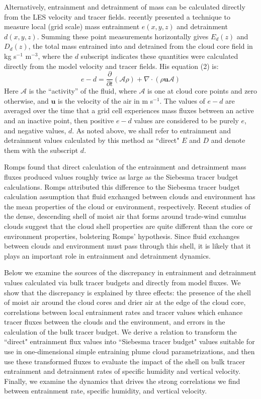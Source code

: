 \documentclass[12pt]{article}
\begin{document}
Alternatively, entrainment and detrainment of mass can be calculated directly
from the LES velocity and tracer fields.  \cite{Romps2010} recently presented a 
technique to measure local (grid scale) mass entrainment $e(x,y,z)$ and
detrainment $d(x,y,z)$.  Summing these point measurements horizontally gives 
$E_d(z)$ and $D_d(z)$, the total mass entrained into and detrained from the
cloud core field in kg s$^{-1}$ m$^{-3}$, where the $d$ subscript indicates 
these quantities were calculated directly from the model velocity and tracer
fields.  His equation (2) is:
\begin{equation}
  \label{eq:romps_e_minus_d}
  e - d = \frac{\partial}{\partial t}(\mathcal{A}\rho) 
        + \nabla \cdot (\rho \mathbf{u} \mathcal{A}) 
\end{equation}
Here $\mathcal{A}$ is the ``activity'' of the fluid, where
$\mathcal{A}$ is one at cloud core points and zero otherwise, and
$\mathbf{u}$ is the velocity of the air in m s$^{-1}$.  The values of
$e - d$ are averaged over the time that a grid cell experiences mass
fluxes between an active and an inactive point, then positive $e-d$
values are considered to be purely $e$, and negative values, $d$.  As
noted above, we shall refer to entrainment and detrainment values
calculated by this method as ``direct" $E$ and $D$ and denote them
with the subscript $d$.

Romps found that direct calculation of the entrainment and
detrainment mass fluxes produced values roughly twice as large as
the Siebesma tracer budget calculations.  Romps attributed this difference
to the Siebesma tracer budget calculation assumption that fluid
exchanged between clouds and environment has the mean properties of
the cloud or environment, respectively.  Recent studies of the dense,
descending shell of moist air that forms around trade-wind cumulus
clouds \citep{Heus2008, Wang2010} suggest that the cloud shell
properties are quite different than the core or environment
properties, bolstering Romps' hypothesis.  Since fluid exchanges
between clouds and environment must pass through this shell, it is
likely that it plays an important role in entrainment and detrainment
dynamics.

Below we examine the sources of the discrepancy in entrainment and
detrainment values calculated via bulk tracer budgets and directly
from model fluxes.  We show that the discrepancy is explained by three
effects: the presence of the shell of moist air around the cloud cores
and drier air at the edge of the cloud core, correlations between
local entrainment rates and tracer values which enhance tracer fluxes
between the clouds and the environment, and errors in the calculation
of the bulk tracer budget.  We derive a relation to transform the
``direct" entrainment flux values into ``Siebesma tracer budget"
values suitable for use in one-dimensional simple entraining plume
cloud parametrizations, and then use these transformed fluxes to
evaluate the impact of the shell on bulk tracer entrainment and
detrainment rates of specific humidity and vertical velocity.  Finally, we
examine the dynamics that drives the strong correlations we find
between entrainment rate, specific humidity, and vertical velocity.
\end{document}

